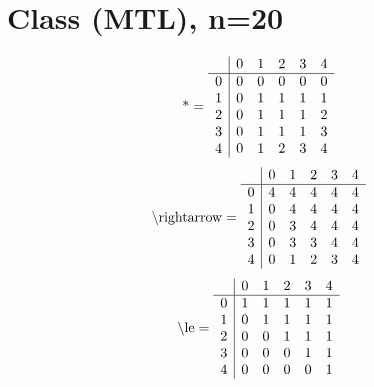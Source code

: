 \documentclass[11pt]{article}
\begin{document}
\section{Class (MTL), n=20}
\[\text{*} = 
\begin{array}{r | r r r r r}
 & 0 & 1 & 2 & 3 & 4 \\ \hline
0 & 0 & 0 & 0 & 0 & 0 \\
1 & 0 & 1 & 1 & 1 & 1 \\
2 & 0 & 1 & 1 & 1 & 2 \\
3 & 0 & 1 & 1 & 1 & 3 \\
4 & 0 & 1 & 2 & 3 & 4 \\
\end{array}
\]
\[\text{\textbackslash rightarrow} = 
\begin{array}{r | r r r r r}
 & 0 & 1 & 2 & 3 & 4 \\ \hline
0 & 4 & 4 & 4 & 4 & 4 \\
1 & 0 & 4 & 4 & 4 & 4 \\
2 & 0 & 3 & 4 & 4 & 4 \\
3 & 0 & 3 & 3 & 4 & 4 \\
4 & 0 & 1 & 2 & 3 & 4 \\
\end{array}
\]
\[\text{\textbackslash le} = 
\begin{array}{r | r r r r r}
 & 0 & 1 & 2 & 3 & 4 \\ \hline
0 & 1 & 1 & 1 & 1 & 1 \\
1 & 0 & 1 & 1 & 1 & 1 \\
2 & 0 & 0 & 1 & 1 & 1 \\
3 & 0 & 0 & 0 & 1 & 1 \\
4 & 0 & 0 & 0 & 0 & 1 \\
\end{array}
\]
\end{document}

